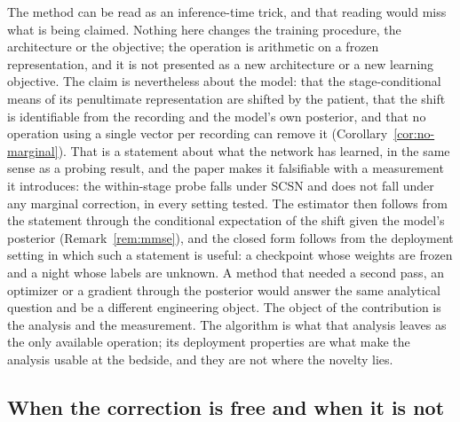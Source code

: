 The method can be read as an inference-time trick, and that reading would miss
what is being claimed. Nothing here changes the training procedure, the
architecture or the objective; the operation is arithmetic on a frozen
representation, and it is not presented as a new architecture or a new learning
objective. The claim is nevertheless about the model: that the
stage-conditional means of its penultimate representation are shifted by the
patient, that the shift is identifiable from the recording and the model's own
posterior, and that no operation using a single vector per recording can
remove it (Corollary~\ref{cor:no-marginal}). That is a statement about what the network
has learned, in the same sense as a probing result, and the paper makes it
falsifiable with a measurement it introduces: the within-stage probe falls
under SCSN and does not fall under any marginal correction, in every setting
tested. The estimator then follows from the statement through the conditional
expectation of the shift given the model's posterior
(Remark~\ref{rem:mmse}), and the closed form follows from the deployment
setting in which such a statement is useful: a checkpoint whose weights are
frozen and a night whose labels are unknown. A method that needed a second
pass, an optimizer or a gradient through the posterior would answer the same
analytical question and be a different engineering object. The object of the
contribution is the analysis and the measurement. The algorithm is what that
analysis leaves as the only available operation; its deployment properties are
what make the analysis usable at the bedside, and they are not where the
novelty lies.

\subsection{When the correction is free and when it is not}


